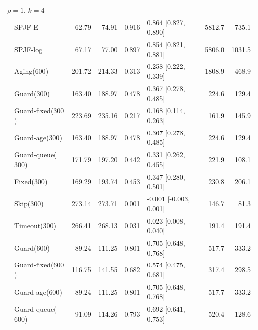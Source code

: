 \documentclass[mathematics,supfile,submit,moreauthors]{Definitions/mdpi}
\newcommand{\devnum}[1]{#1}
\begin{document}
\begin{table}[p]
\begin{tabular}{llrrrlrr}
\midrule
\multicolumn{8}{l}{$\rho = \devnum{1}$, $k = \devnum{4}$} \\
 & SPJF-E                 & \devnum{62.79} & \devnum{74.91} & \devnum{0.916} & \devnum{0.864 [0.827, 0.890]} & \devnum{5812.7} & \devnum{735.1} \\
 & SPJF-log               & \devnum{67.17} & \devnum{77.00} & \devnum{0.897} & \devnum{0.854 [0.821, 0.881]} & \devnum{5806.0} & \devnum{1031.5} \\
 & Aging($\devnum{600}$)  & \devnum{201.72} & \devnum{214.33} & \devnum{0.313} & \devnum{0.258 [0.222, 0.339]} & \devnum{1808.9} & \devnum{468.9} \\
 & Guard($\devnum{300}$)  & \devnum{163.40} & \devnum{188.97} & \devnum{0.478} & \devnum{0.367 [0.278, 0.485]} & \devnum{224.6} & \devnum{129.4} \\
 & Guard-fixed($\devnum{300}$) & \devnum{223.69} & \devnum{235.16} & \devnum{0.217} & \devnum{0.168 [0.114, 0.263]} & \devnum{161.9} & \devnum{145.9} \\
 & Guard-age($\devnum{300}$) & \devnum{163.40} & \devnum{188.97} & \devnum{0.478} & \devnum{0.367 [0.278, 0.485]} & \devnum{224.6} & \devnum{129.4} \\
 & Guard-queue($\devnum{300}$) & \devnum{171.79} & \devnum{197.20} & \devnum{0.442} & \devnum{0.331 [0.262, 0.455]} & \devnum{221.9} & \devnum{108.1} \\
 & Fixed($\devnum{300}$)  & \devnum{169.29} & \devnum{193.74} & \devnum{0.453} & \devnum{0.347 [0.280, 0.501]} & \devnum{230.8} & \devnum{206.1} \\
 & Skip($\devnum{300}$)   & \devnum{273.14} & \devnum{273.71} & \devnum{0.001} & \devnum{-0.001 [-0.003, 0.001]} & \devnum{146.7} & \devnum{81.3} \\
 & Timeout($\devnum{300}$) & \devnum{266.41} & \devnum{268.13} & \devnum{0.031} & \devnum{0.023 [0.008, 0.040]} & \devnum{191.4} & \devnum{191.4} \\
 & Guard($\devnum{600}$)  & \devnum{89.24} & \devnum{111.25} & \devnum{0.801} & \devnum{0.705 [0.648, 0.768]} & \devnum{517.7} & \devnum{333.2} \\
 & Guard-fixed($\devnum{600}$) & \devnum{116.75} & \devnum{141.55} & \devnum{0.682} & \devnum{0.574 [0.475, 0.681]} & \devnum{317.4} & \devnum{298.5} \\
 & Guard-age($\devnum{600}$) & \devnum{89.24} & \devnum{111.25} & \devnum{0.801} & \devnum{0.705 [0.648, 0.768]} & \devnum{517.7} & \devnum{333.2} \\
 & Guard-queue($\devnum{600}$) & \devnum{91.09} & \devnum{114.26} & \devnum{0.793} & \devnum{0.692 [0.641, 0.753]} & \devnum{520.4} & \devnum{128.6} \\

\end{tabular}
\end{table}
\end{document}
